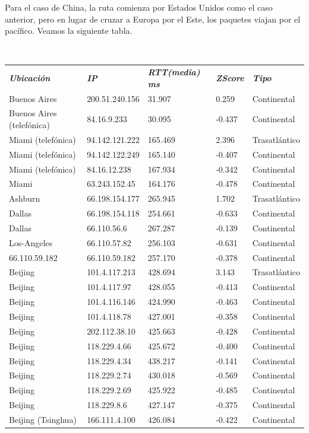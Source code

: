 Para el caso de China, la ruta comienza por Estados Unidos como el caso anterior, pero en lugar de cruzar a Europa por el Este, los paquetes viajan por el pac\'ifico.
Veamos la siguiente tabla.

~

\begin{tabular}{lllll}
	\textit{\textbf{Ubicaci\'on}}	&	\textit{\textbf{IP}}	&	\textit{\textbf{RTT(media) ms}}	&	\textit{\textbf{ZScore}}	&	\textit{\textbf{Tipo}}	\\
	Buenos Aires			&	200.51.240.156	&	31.907	&	0.259	&	Continental	\\
	Buenos Aires (telef\'onica)	&	84.16.9.233	&	30.095	&	-0.437	&	Continental	\\
	Miami (telef\'onica)		&	94.142.121.222	&	165.469	&	2.396	&	Trasatl\'antico	\\
	Miami (telef\'onica)		&	94.142.122.249	&	165.140	&	-0.407	&	Continental	\\
	Miami (telef\'onica)		&	84.16.12.238	&	167.934	&	-0.342	&	Continental	\\
	Miami 				&	63.243.152.45	&	164.176	&	-0.478	&	Continental	\\
	Ashburn				&	66.198.154.177	&	265.945	&	1.702	&	Trasatl\'antico	\\
	Dallas				&	66.198.154.118	&	254.661	&	-0.633	&	Continental	\\
	Dallas				&	66.110.56.6	&	267.287	&	-0.139	&	Continental	\\
	Los-Angeles			&	66.110.57.82	&	256.103	&	-0.631	&	Continental	\\
	66.110.59.182			&	66.110.59.182	&	257.170	&	-0.378	&	Continental	\\
	Beijing				&	101.4.117.213	&	428.694	&	3.143	&	Trasatl\'antico	\\
	Beijing				&	101.4.117.97	&	428.055	&	-0.413	&	Continental	\\
	Beijing				&	101.4.116.146	&	424.990	&	-0.463	&	Continental	\\
	Beijing				&	101.4.118.78	&	427.001	&	-0.358	&	Continental	\\
	Beijing				&	202.112.38.10	&	425.663	&	-0.428	&	Continental	\\
	Beijing				&	118.229.4.66	&	425.672	&	-0.400	&	Continental	\\
	Beijing				&	118.229.4.34	&	438.217	&	-0.141	&	Continental	\\
	Beijing				&	118.229.2.74	&	430.018	&	-0.569	&	Continental	\\
	Beijing				&	118.229.2.69	&	425.922	&	-0.485	&	Continental	\\
	Beijing				&	118.229.8.6	&	427.147	&	-0.375	&	Continental	\\
	Beijing (Tsinghua)		&	166.111.4.100	&	426.084	&	-0.422	&	Continental	\\

\end{tabular}

